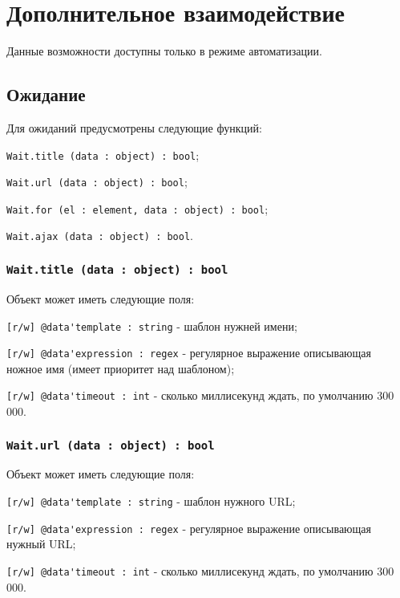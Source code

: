 \section{Дополнительное взаимодействие}

Данные возможности доступны только в режиме автоматизации.

\subsection{Ожидание}

Для ожиданий предусмотрены следующие функций:
\begin{icItems}
	\item \lstinline|Wait.title (data : object) : bool|;
	\item \lstinline|Wait.url (data : object) : bool|;
	\item \lstinline|Wait.for (el : element, data : object) : bool|;
	\item \lstinline|Wait.ajax (data : object) : bool|.
\end{icItems}

\subsubsection{\lstinline|Wait.title (data : object) : bool|}

Объект  может иметь следующие поля:
\begin{icItems}
	\item \lstinline|[r/w] @data'template : string| - шаблон нужней имени;
	\item \lstinline|[r/w] @data'expression : regex| - регулярное выражение описывающая ножное имя (имеет приоритет над шаблоном);
	\item \lstinline|[r/w] @data'timeout : int| - сколько миллисекунд ждать, по умолчанию 300 000.
\end{icItems}

\subsubsection{\lstinline|Wait.url (data : object) : bool|}

Объект  может иметь следующие поля:
\begin{icItems}
	\item \lstinline|[r/w] @data'template : string| - шаблон нужного URL;
	\item \lstinline|[r/w] @data'expression : regex| - регулярное выражение описывающая нужный URL;
	\item \lstinline|[r/w] @data'timeout : int| - сколько миллисекунд ждать, по умолчанию 300 000.
\end{icItems}

